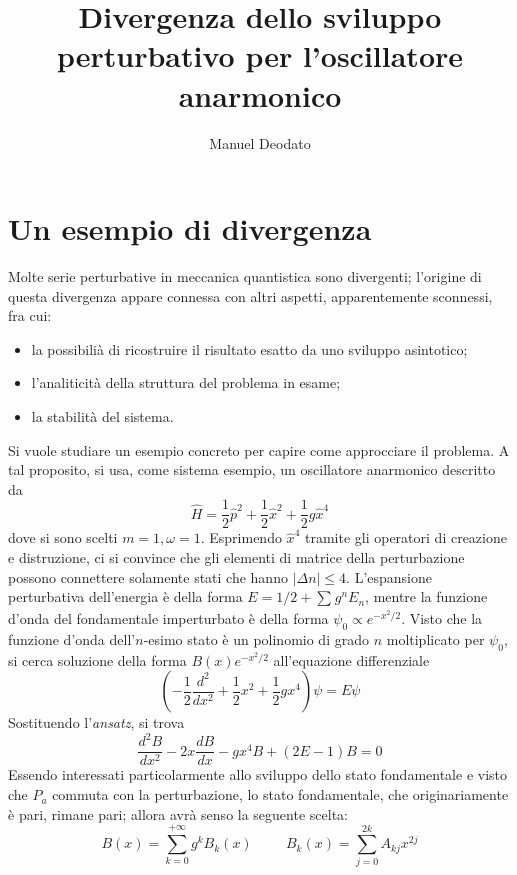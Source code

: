 \documentclass[10pt, a4paper]{scrartcl} %
\title{Divergenza dello sviluppo
perturbativo per l'oscillatore\\
anarmonico\\}
\author{Manuel Deodato}
\date{}
\renewcommand{\maketitle}{
\begin{center}
{\sffamily
{\fontsize{20}{20}\selectfont\MakeUppercase\thetitle}}

\vspace{0.2in}

{\large\scshape\sffamily\theauthor}
\end{center}
}
\numberwithin{equation}{section}
\theoremstyle{style2}
\theoremstyle{style1}
\begin{document}
\maketitle
\newpage
\tableofcontents
\newpage
\section{Un esempio di divergenza}
Molte serie perturbative in meccanica quantistica sono divergenti; l'origine di questa divergenza appare connessa con altri aspetti, apparentemente sconnessi, fra cui:
\begin{itemize}
	\item la possibili\`a di ricostruire il risultato esatto da uno sviluppo asintotico;
	\item l'analiticit\`a della struttura del problema in esame;
	\item la stabilit\`a del sistema.
\end{itemize}
Si vuole studiare un esempio concreto per capire come approcciare il problema.
A tal proposito, si usa, come sistema esempio, un oscillatore anarmonico descritto da
\begin{equation}
	\hat{H} = \frac{1}{2}\hat{p}^2 + \frac{1}{2}\hat{x}^2 + \frac{1}{2}g\hat{x}^4
\end{equation}
dove si sono scelti $m=1,\omega =1$.
Esprimendo $\hat{x}^4$ tramite gli operatori di creazione e distruzione, ci si convince che gli elementi di matrice della perturbazione possono connettere solamente stati che hanno $|\Delta  n| \le 4$.
L'espansione perturbativa dell'energia \`e della forma $E = 1/2 + \sum_{}^{} g^n E_n$, mentre la funzione d'onda del fondamentale imperturbato \`e della forma $\psi _0 \propto e^{-  x^2 / 2} $.
Visto che la funzione d'onda dell'$n$-esimo stato \`e un polinomio di grado $n$ moltiplicato per $\psi _0$, si cerca soluzione della forma $B(x) e^{-x^2 / 2} $ all'equazione differenziale
\begin{equation}
\left(	-\frac{1}{2} \frac{d ^2}{d x^2}  + \frac{1}{2}x^2  +\frac{1}{2}gx^4  \right) \psi  = E \psi 
\end{equation}
Sostituendo l'\textit{ansatz}, si trova
\[
\frac{d ^2B}{d x^2} - 2x \frac{d B}{d x}  - gx^4 B + (2E - 1) B = 0
\] 
Essendo interessati particolarmente allo sviluppo dello stato fondamentale e visto che $\hat{P}_a$ commuta con la perturbazione, lo stato fondamentale, che originariamente \`e pari, rimane pari; allora avr\`a senso la seguente scelta: 
\[
B(x) = \sum_{k=0}^{+\infty} g^k B_k(x) \hspace{1cm} B_k(x) = \sum_{j=0}^{2k} A_{kj} x^{2j} 
\] 
\end{document}
